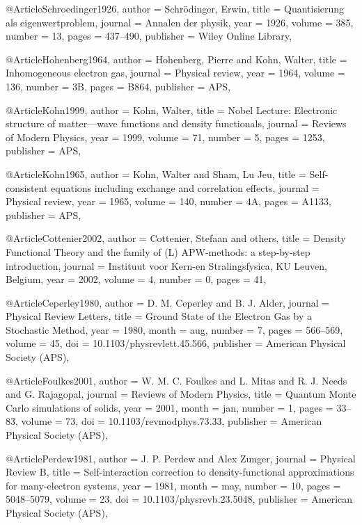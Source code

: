 @Article{Schroedinger1926,
  author    = {Schr{\"o}dinger, Erwin},
  title     = {Quantisierung als eigenwertproblem},
  journal   = {Annalen der physik},
  year      = {1926},
  volume    = {385},
  number    = {13},
  pages     = {437--490},
  publisher = {Wiley Online Library},
}

@Article{Hohenberg1964,
  author    = {Hohenberg, Pierre and Kohn, Walter},
  title     = {Inhomogeneous electron gas},
  journal   = {Physical review},
  year      = {1964},
  volume    = {136},
  number    = {3B},
  pages     = {B864},
  publisher = {APS},
}

@Article{Kohn1999,
  author    = {Kohn, Walter},
  title     = {Nobel Lecture: Electronic structure of matter—wave functions and density functionals},
  journal   = {Reviews of Modern Physics},
  year      = {1999},
  volume    = {71},
  number    = {5},
  pages     = {1253},
  publisher = {APS},
}

@Article{Kohn1965,
  author    = {Kohn, Walter and Sham, Lu Jeu},
  title     = {Self-consistent equations including exchange and correlation effects},
  journal   = {Physical review},
  year      = {1965},
  volume    = {140},
  number    = {4A},
  pages     = {A1133},
  publisher = {APS},
}

@Article{Cottenier2002,
  author  = {Cottenier, Stefaan and others},
  title   = {Density Functional Theory and the family of (L) APW-methods: a step-by-step introduction},
  journal = {Instituut voor Kern-en Stralingsfysica, KU Leuven, Belgium},
  year    = {2002},
  volume  = {4},
  number  = {0},
  pages   = {41},
}

@Article{Ceperley1980,
  author    = {D. M. Ceperley and B. J. Alder},
  journal   = {Physical Review Letters},
  title     = {Ground State of the Electron Gas by a Stochastic Method},
  year      = {1980},
  month     = {aug},
  number    = {7},
  pages     = {566--569},
  volume    = {45},
  doi       = {10.1103/physrevlett.45.566},
  publisher = {American Physical Society ({APS})},
}

@Article{Foulkes2001,
  author    = {W. M. C. Foulkes and L. Mitas and R. J. Needs and G. Rajagopal},
  journal   = {Reviews of Modern Physics},
  title     = {Quantum Monte Carlo simulations of solids},
  year      = {2001},
  month     = {jan},
  number    = {1},
  pages     = {33--83},
  volume    = {73},
  doi       = {10.1103/revmodphys.73.33},
  publisher = {American Physical Society ({APS})},
}

@Article{Perdew1981,
  author    = {J. P. Perdew and Alex Zunger},
  journal   = {Physical Review B},
  title     = {Self-interaction correction to density-functional approximations for many-electron systems},
  year      = {1981},
  month     = {may},
  number    = {10},
  pages     = {5048--5079},
  volume    = {23},
  doi       = {10.1103/physrevb.23.5048},
  publisher = {American Physical Society ({APS})},
}

